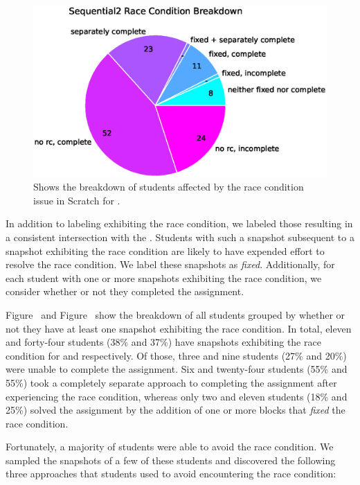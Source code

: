 \begin{figure}[!t]
\centering \includegraphics[trim=0 .5in 0 0, clip, width=5.30in]{graphs/race_condition_Sequential2.eps}
\caption{Shows the breakdown of students affected by the race condition issue
  in Scratch for \stwo{}.}
\end{figure}

In addition to labeling  exhibiting the race condition, we labeled those
resulting in a consistent intersection with the \zebra{}. Students with such a
snapshot subsequent to a snapshot exhibiting the race condition are likely to
have expended effort to resolve the race condition. We label these snapshots as
\emph{fixed}. Additionally, for each student with one or more snapshots
exhibiting the race condition, we consider whether or not they completed the
assignment.

Figure~ and Figure~ show the breakdown
of all students grouped by whether or not they have at least one snapshot
exhibiting the race condition. In total, eleven and forty-four students (38\%
and 37\%) have snapshots exhibiting the race condition for \sone{} and \stwo{}
respectively. Of those, three and nine students (27\% and 20\%) were unable to
complete the assignment. Six and twenty-four students (55\% and 55\%) took a
completely separate approach to completing the assignment after experiencing
the race condition, whereas only two and eleven students (18\% and 25\%) solved
the assignment by the addition of one or more blocks that \emph{fixed} the race
condition.

Fortunately, a majority of students were able to avoid the race condition. We
sampled the snapshots of a few of these students and discovered the following
three approaches that students used to avoid encountering the race condition:

